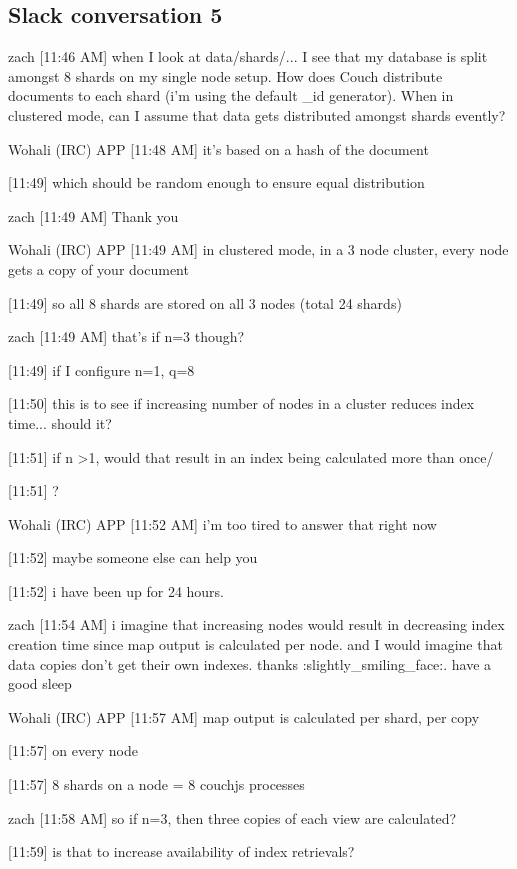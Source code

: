 \subsection{Slack conversation 5}
\label{appendix:slack5}
zach [11:46 AM]
when I look at data/shards/... I see that my database is split amongst 8 shards on my single node setup. How does Couch distribute documents to each shard (i'm using the default \_id generator). When in clustered mode, can I assume that data gets distributed amongst shards evently?

Wohali (IRC) APP [11:48 AM]
it's based on a hash of the document

[11:49]
which should be random enough to ensure equal distribution

zach [11:49 AM]
Thank you

Wohali (IRC) APP [11:49 AM]
in clustered mode, in a 3 node cluster, every node gets a copy of your document

[11:49]
so all 8 shards are stored on all 3 nodes (total 24 shards)

zach [11:49 AM]
that's if n=3 though?

[11:49]
if I configure n=1, q=8

    [11:50]
this is to see if increasing number of nodes in a cluster reduces index time... should it?

[11:51]
if n \textgreater 1, would that result in an index being calculated more than once/

[11:51]
?

Wohali (IRC) APP [11:52 AM]
i'm too tired to answer that right now

    [11:52]
maybe someone else can help you

    [11:52]
i have been up for 24 hours.

zach [11:54 AM]
i imagine that increasing nodes would result in decreasing index creation time since map output is calculated per node. and I would imagine that data copies don't get their own indexes. thanks :slightly\_smiling\_face:. have a good sleep

Wohali (IRC) APP [11:57 AM]
map output is calculated per shard, per copy

    [11:57]
on every node

    [11:57]
8 shards on a node = 8 couchjs processes

zach [11:58 AM]
so if n=3, then three copies of each view are calculated?

[11:59]
is that to increase availability of index retrievals?

